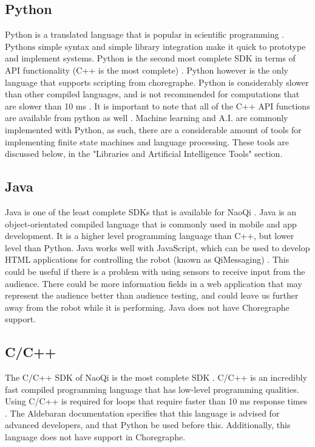 \documentclass[onecolumn, draftclsnofoot,10pt, compsoc]{IEEEtran}
\begin{document}
  \subsection{Python}
  Python is a translated language that is popular in scientific programming \cite{Python.org}. Pythons simple syntax and simple library integration make it quick to prototype and implement systems. Python is the second most complete SDK in terms of API functionality (C++ is the most complete) \cite{languageBenefits}. Python however is the only language that supports scripting from choregraphe. Python is considerably slower than other compiled languages, and is not recommended for computations that are slower than 10 ms \cite{programmingLanguages}. It is important to note that all of the C++ API functions are available from python as well \cite{pythonSDK}. Machine learning and A.I. are commonly implemented with Python, as such, there are a considerable amount of tools for implementing finite state machines and language processing. These tools are discussed below, in the "Libraries and Artificial Intelligence Tools" section.
  \subsection{Java}

  Java is one of the least complete SDKs that is available for NaoQi \cite{programmingLanguages}. Java is an object-orientated compiled language that is commonly used in mobile and app development. It is a higher level programming language than C++, but lower level than Python. Java works well with JavaScript, which can be used to develop HTML applications for controlling the robot (known as QiMessaging) \cite{qimessagingjavascript}. This could be useful if there is a problem with using sensors to receive input from the audience. There could be more information fields in a web application that may represent the audience better than audience testing, and could leave us further away from the robot while it is performing. Java does not have Choregraphe support.
  \subsection{C/C++}

  The C/C++ SDK of NaoQi is the most complete SDK \cite{programmingLanguages}. C/C++ is an incredibly fast compiled programming language that has low-level programming qualities. Using C/C++ is required for loops that require faster than 10 ms response times \cite{programmingLanguages}. The Aldebaran documentation specifies that this language is advised for advanced developers, and that Python be used before this. Additionally, this language does not have support in Choregraphe. 
\end{document}
